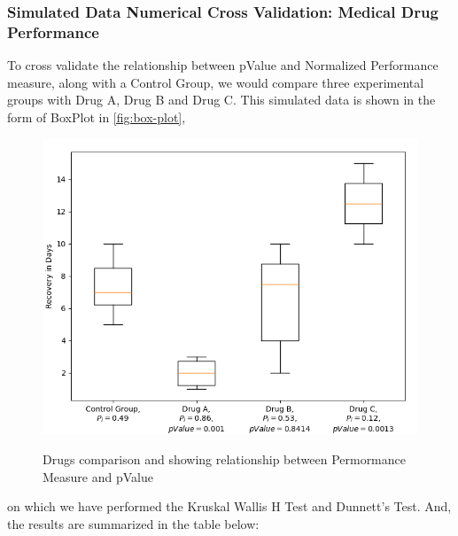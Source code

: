 \documentclass[a4paper,fleqn,review]{cas-sc}
\begin{document}
\subsubsection{Simulated Data Numerical Cross Validation: Medical Drug Performance}
To cross validate the relationship between pValue and Normalized Performance measure, along with a Control Group, we would compare three experimental groups with Drug A, Drug B and Drug C. This simulated data is shown in the form of BoxPlot in \autoref{fig:box-plot}, 
\begin{figure}
	\caption{Drugs comparison and showing relationship between Permormance Measure and pValue}
	\centering
	\includegraphics [scale=0.75]{simulation-data-kruskal-dunnett.png}
	\label{fig:box-plot}
\end{figure}
on which we have performed the Kruskal Wallis H Test and Dunnett's Test. And, the results are summarized in the table below:
	
\end{document}
